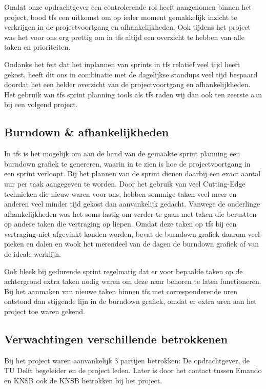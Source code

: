Omdat onze opdrachtgever een controlerende rol heeft aangenomen binnen het project, bood \ac{tfs} een uitkomst om op ieder moment gemakkelijk inzicht te verkrijgen in de projectvoortgang en afhankelijkheden. Ook tijdens het project was het voor ons erg prettig om in \ac{tfs} altijd een overzicht te hebben van alle taken en prioriteiten. 

Ondanks het feit dat het inplannen van sprints in \ac{tfs} relatief veel tijd heeft gekost, heeft dit ons in combinatie met de dagelijkse standups veel tijd bespaard doordat het een helder overzicht van de projectvoortgang en afhankelijkheden. Het gebruik van \ac{tfs} sprint planning tools als \ac{tfs} raden wij dan ook ten zeerste aan bij een volgend project.

\subsection{Burndown \& afhankelijkheden}
In \ac{tfs} is het mogelijk om aan de hand van de gemaakte sprint planning een burndown grafiek te genereren, waarin in te zien is hoe de projectvoortgang in een sprint verloopt. Bij het plannen van de sprint dienen daarbij een exact aantal uur per taak aangegeven te worden. Door het gebruik van veel Cutting-Edge technieken die nieuw waren voor ons, hebben sommige taken veel meer en anderen veel minder tijd gekost dan aanvankelijk gedacht. Vanwege de onderlinge afhankelijkheden was het soms lastig om verder te gaan met taken die berustten op andere taken die vertraging op liepen. Omdat deze taken op \ac{tfs} bij een vertraging niet afgevinkt konden worden, bevat de burndown grafiek daarom veel pieken en dalen en wook het merendeel van de dagen de burndown grafiek af van de ideale werklijn. 

Ook bleek bij gedurende sprint regelmatig dat er voor bepaalde taken op de achtergrond extra taken nodig waren om deze naar behoren te laten functioneren. Bij het aanmaken van nieuwe taken binnen \ac{tfs} met corresponderende uren ontstond dan stijgende lijn in de burndown grafiek, omdat er extra uren aan het project toe waren gekend.


\subsection{Verwachtingen verschillende betrokkenen}
Bij het project waren aanvankelijk 3 partijen betrokken: De opdrachtgever, de TU Delft begeleider en de project leden.
Later is door het contact tussen Emando en KNSB ook de KNSB betrokken bij het project. 

